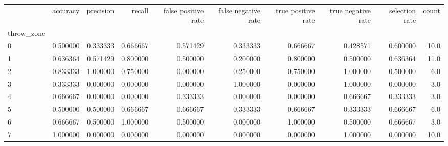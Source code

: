 \begin{tabular}{lrrrrrrrrr}
\toprule
{} &  accuracy &  precision &    recall &  false positive rate &  false negative rate &  true positive rate &  true negative rate &  selection rate &  count \\
throw\_zone &           &            &           &                      &                      &                     &                     &                 &        \\
\midrule
0          &  0.500000 &   0.333333 &  0.666667 &             0.571429 &             0.333333 &            0.666667 &            0.428571 &        0.600000 &   10.0 \\
1          &  0.636364 &   0.571429 &  0.800000 &             0.500000 &             0.200000 &            0.800000 &            0.500000 &        0.636364 &   11.0 \\
2          &  0.833333 &   1.000000 &  0.750000 &             0.000000 &             0.250000 &            0.750000 &            1.000000 &        0.500000 &    6.0 \\
3          &  0.333333 &   0.000000 &  0.000000 &             0.000000 &             1.000000 &            0.000000 &            1.000000 &        0.000000 &    3.0 \\
4          &  0.666667 &   0.000000 &  0.000000 &             0.333333 &             0.000000 &            0.000000 &            0.666667 &        0.333333 &    3.0 \\
5          &  0.500000 &   0.500000 &  0.666667 &             0.666667 &             0.333333 &            0.666667 &            0.333333 &        0.666667 &    6.0 \\
6          &  0.666667 &   0.500000 &  1.000000 &             0.500000 &             0.000000 &            1.000000 &            0.500000 &        0.666667 &    3.0 \\
7          &  1.000000 &   0.000000 &  0.000000 &             0.000000 &             0.000000 &            0.000000 &            1.000000 &        0.000000 &   10.0 \\
\bottomrule
\end{tabular}
